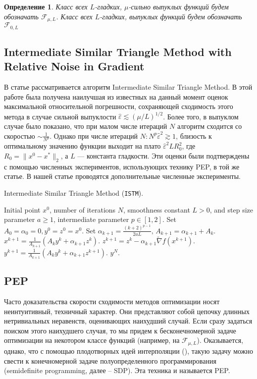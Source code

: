 \documentclass{article}
\newtheorem{Def}{Определение}[section]
\begin{document}
\begin{Def}
Класс всех $L$-гладких, $\mu$-сильно выпуклых функций будем обозначать $\mathcal{F}_{\mu, L}$. Класс всех $L$-гладких, выпуклых функций будем обозначать $\mathcal{F}_{0, L}$
\end{Def}

\subsection{Intermediate Similar Triangle Method with Relative Noise in Gradient}

В статье \cite{kornilov2023intermediate} рассматривается алгоритм Intermediate Similar Triangle Method. В этой работе была получена наилучшая из известных на данный момент оценок максимальной относительной погрешности, сохраняющей сходимость этого метода в случае сильной выпуклости $\hat{\varepsilon} \lesssim (\mu / L)^{1/2}$. Более того, в выпуклом случае было показано, что при малом числе итераций $N$ алгоритм сходится со скоростью $\sim \frac{1}{N^p}$. Однако при числе итераций $N: N^p \hat{\varepsilon}^2 \gtrsim 1$, близость к оптимальному значению функции выходит на плато $\hat{\varepsilon}^2 L R_0^2$, где $R_0 = \|x^0 - x^*\|_2$, а $L$ --- константа гладкости.  Эти оценки были подтверждены с помощью численных экспериментов, использующих технику PEP, в той же статье. В нашей статье проводятся дополнительные численные эксперименты.

\begin{algorithm}[!ht]
\caption{ Intermediate  Similar Triangle Method (\texttt{ISTM}).}\label{alg_STM_relative}
\begin{algorithmic}[1]
   \REQUIRE Initial point $x^0$, number of iterations $N$, smoothness constant  $L>0$, and step size parameter $a \geq 1$, intermediate parameter $p \in [1,2]$. 
   \STATE Set $A_0 = \alpha_0 = 0, y^0 = z^0 = x^0$.
   \STATE Set $\alpha_{k+1} = \frac{(k+2)^{p-1}}{2aL}, \, A_{k+1} = \alpha_{k+1} + A_k$. \label{item_3}
   \STATE $x^{k+1} = \frac{1}{A_{k+1}} \left(A_k y^k + \alpha_{k+1} z^k\right) $. \label{item_4}
   \STATE $z^{k+1} = z^k - \alpha_{k+1} \widetilde{\nabla} f(x^{k+1})$.
   \STATE $y^{k+1} = \frac{1}{A_{k+1}} \left(A_k y^k + \alpha_{k+1} z^{k+1}\right)$.
   \ENDFOR
    \ENSURE 
	$y^N$.
\end{algorithmic}
\end{algorithm}

\subsection{PEP}
Часто доказательства скорости сходимости методов оптимизации носят неинтуитивный, техничный характер. Они представляют собой цепочку длинных нетривиальных неравенств, оценивающих наихудший случай. Если сразу задаться поиском этого наихудшего случая, то мы придем к бесконечномерной задаче оптимизации на некотором классе функций (например, на $\mathcal{F}_{\mu, L}$). Оказывается, однако, что с помощью плодотворных идей интерполяции (\cite{taylor2017smooth}), такую задачу можно свести к конечномерной задаче полуопределенного программирования (semidefinite programming, далее -- SDP). Эта техника и называется PEP. 
\end{document}
